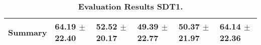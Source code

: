 \begin{table}[htb]
{\begin{tabular}{llllll}
\midrule
\textbf{Summary                                  } &                  \phantom{0}64.19 $\pm$ 22.40 &                      \phantom{0}52.52 $\pm$ 20.17 &                  \phantom{0}49.39 $\pm$ 22.77 &                  \phantom{0}50.37 $\pm$ 21.97 &            \phantom{0}64.14 $\pm$ 22.36 \\
\bottomrule
\end{tabular}%
}
\caption{\textbf{Evaluation Results SDT1.}}
\label{tab:eval-results}
\end{table}


